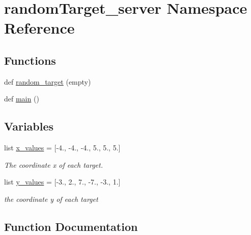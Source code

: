 \hypertarget{namespacerandom_target__server}{}\section{random\+Target\+\_\+server Namespace Reference}
\label{namespacerandom_target__server}
\subsection*{Functions}
\begin{DoxyCompactItemize}
\item 
def \hyperlink{namespacerandom_target__server_ac39a7e4d5a1cdbb775fa4086bd41f605}{random\+\_\+target} (empty)
\item 
def \hyperlink{namespacerandom_target__server_a5cb1674686702064df5babb388733240}{main} ()
\end{DoxyCompactItemize}
\subsection*{Variables}
\begin{DoxyCompactItemize}
\item 
list \hyperlink{namespacerandom_target__server_a3d4404cd7c05ddf6c084aaf0f9d9c6e7}{x\+\_\+values} = \mbox{[}-\/4., -\/4., -\/4., 5., 5., 5.\mbox{]}
\begin{DoxyCompactList}\small\item\em The coordinate x of each target. \end{DoxyCompactList}\item 
list \hyperlink{namespacerandom_target__server_a6021a8a552149867a092175e89321cb7}{y\+\_\+values} = \mbox{[}-\/3., 2., 7., -\/7., -\/3., 1.\mbox{]}
\begin{DoxyCompactList}\small\item\em the coordinate y of each target \end{DoxyCompactList}\end{DoxyCompactItemize}


\subsection{Function Documentation}

